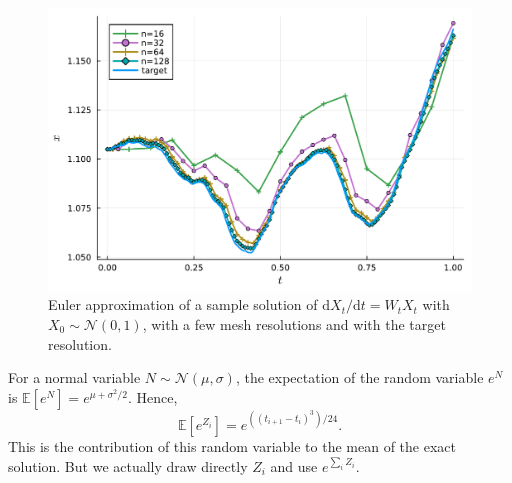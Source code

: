 \documentclass[reqno,12pt]{amsart}
\theoremstyle{plain} %
\theoremstyle{definition} %
\begin{document}
\begin{figure}
    \includegraphics[scale=0.6]{img/approximation_linearhomogenous.pdf}
    \caption{Euler approximation of a sample solution of $\mathrm{d}X_t/\mathrm{d}t = W_t X_t$ with $X_0 \sim \mathcal{N}(0, 1)$, with a few mesh resolutions and with the target resolution.}
    \label{samplepathslinearhomogeneousrode}
\end{figure}

For a normal variable $N \sim \mathcal{N}(\mu, \sigma)$, the expectation of the random variable $e^N$ is $\mathbb{E}[e^N] = e^{\mu + \sigma^2/2}$. Hence,
\begin{equation}
    \label{Xtlinearhomogeneousrodeestimateexponentialofnomral}
    \mathbb{E}[e^{Z_i}] = e^{((t_{i+1}- t_i)^3)/24}.
\end{equation}
This is the contribution of this random variable to the mean of the exact solution. But we actually draw directly $Z_i$ and use $e^{\sum_i Z_i}$.
\end{document}
